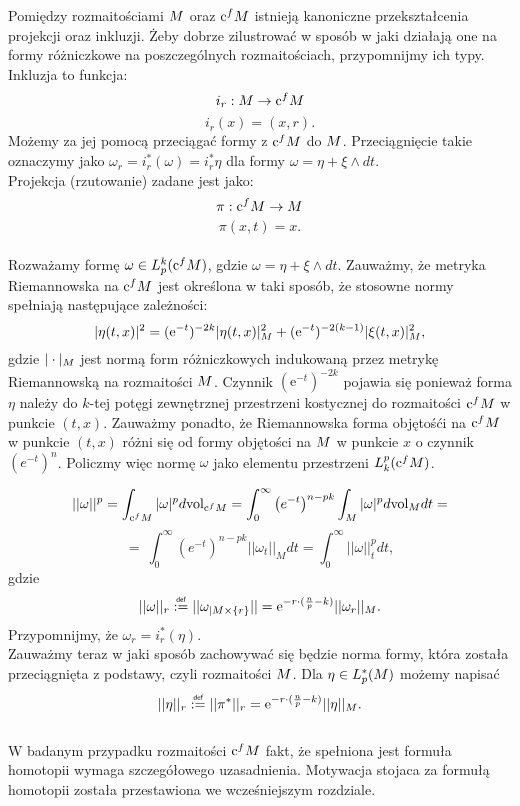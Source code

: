 \documentclass[licencjacka]{pracamgr}
\theoremstyle{definition}
\theoremstyle{definition}
\theoremstyle{plain}
\theoremstyle{plain}
\theoremstyle{plain}
\def\cfm{\ensuremath\mathrm{c}^fM}
\def\M{\ensuremath M}
\newcommand\deff{\mathrel{\overset{\makebox[0pt]{\mbox{\normalfont\tiny\sffamily def}}}{:=}}}
\begin{document}
Pomiędzy rozmaitościami $\M$ oraz $\cfm$ istnieją kanoniczne przekształcenia
projekcji oraz inkluzji. Żeby dobrze zilustrować w sposób w jaki działają one
na formy różniczkowe na poszczególnych rozmaitościach, przypomnijmy ich typy.
Inkluzja to funkcja:
\[
    i_r: \M \rightarrow \cfm \\
\]
\[
    i_r(x) = (x, r).
\]
Możemy za jej pomocą przeciągać formy z $\cfm$ do $\M$. Przeciągnięcie takie
oznaczymy jako $\omega_r = i_r^\ast(\omega) = i_r^\ast \eta $ dla formy $\omega
= \eta + \xi \wedge dt$. \\
Projekcja (rzutowanie) zadane jest jako:
\[
    \pi: \cfm \rightarrow \M
\]
\[
    \pi (x, t) = x.
\] \\


Rozważamy formę $\omega \in L^k_p (\cfm)$, gdzie
$\omega = \eta + \xi \wedge dt$.
Zauważmy, że metryka Riemannowska na $\cfm$ jest określona w taki sposób, że
stosowne normy spełniają następujące zależności:
$$
| \eta(t,x) |^2 = (\mathrm{e}^{-t})^{-2k} | \eta(t,x) |^2_{\M} +
(\mathrm{e}^{-t})^{-2(k-1)} | \xi(t,x) |^2_{\M},
$$
gdzie $|\cdot |_{\M} $ jest normą form różniczkowych indukowaną przez
metrykę Riemannowską na rozmaitości $\M$.  Czynnik $(\mathrm{e}^{-t})^{-2k}$
pojawia się ponieważ forma $\eta$ należy do $k$-tej potęgi zewnętrznej
przestrzeni kostycznej do rozmaitości $\cfm$ w punkcie $(t,x)$.  Zauważmy
ponadto, że Riemannowska forma objętośći na $\cfm$ w punkcie $(t,x)$ różni się
od formy objętości na $\M$ w punkcie $x$ o czynnik $(e^{-t})^n$.  Policzmy więc
normę $\omega$ jako elementu przestrzeni $L_k^p (\cfm)$.

\[
    ||\omega ||^p = \int_{\cfm} |\omega |^p d \mathrm{vol}_{\cfm} =
    \int_0^\infty \left( e^{-t} \right)^{n-pk} \int_M |\omega|^p d
    \mathrm{vol}_M dt = 
\]
\[
    = \
    \int_0^\infty \left( e^{-t} \right)^{n-pk} || \omega_t ||_{M} dt = 
    \int_0^\infty || \omega ||_t^p dt,
\] 
gdzie
\[
|| \omega ||_r \deff || \omega_{|M \times \{r\} } || =
\mathrm{e}^{-r \cdot (\frac{n}{p} - k) }  ||\omega_r ||_{\M}.
\]
Przypomnijmy, że $\omega_r = i_r^\ast (\eta)$. \\

Zauważmy teraz w jaki sposób zachowywać się będzie norma formy, która
została przeciągnięta z podstawy, czyli rozmaitości $\M$. Dla 
$\eta \in L_p^\ast (\M)$ możemy napisać
\[
    || \eta ||_r \deff || \pi^\ast ||_r = 
\mathrm{e}^{-r \cdot (\frac{n}{p} - k) }  ||\eta ||_{\M}.
\] \\

W badanym przypadku rozmaitości $\cfm$ fakt, że spełniona jest formuła homotopii
wymaga szczegółowego uzasadnienia. Motywacja stojaca za formułą homotopii
została przestawiona we wcześniejszym rozdziale.\\
\end{document}
